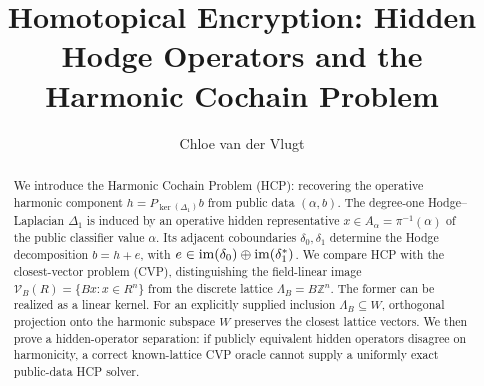 \documentclass[11pt]{article}
\title{Homotopical Encryption: Hidden Hodge Operators and the Harmonic Cochain Problem}
\author{Chloe van der Vlugt}
\date{}
\begin{document}
\maketitle

\begin{abstract}
We introduce the Harmonic Cochain Problem (HCP): recovering the operative
harmonic component \(h=P_{\ker(\Delta_1)}b\) from public data
\((\alpha,b)\). The degree-one Hodge--Laplacian \(\Delta_1\) is induced by
an operative hidden representative \(x\in A_\alpha=\pi^{-1}(\alpha)\) of
the public classifier value \(\alpha\). Its adjacent coboundaries
\(\delta_0,\delta_1\) determine the Hodge decomposition \(b=h+e\), with
\(e\in\operatorname{im}(\delta_0)\oplus\operatorname{im}(\delta_1^\ast)\).
We compare HCP with the closest-vector problem (CVP), distinguishing the
field-linear image \(\mathcal V_B(R)=\{Bx:x\in R^n\}\) from the discrete
lattice \(\Lambda_B=B\mathbb Z^n\). The former can be realized as a linear
kernel. For an explicitly supplied inclusion \(\Lambda_B\subseteq W\),
orthogonal projection onto the harmonic subspace \(W\) preserves the closest
lattice vectors. We then prove a hidden-operator separation: if publicly
equivalent hidden operators disagree on harmonicity, a correct known-lattice
CVP oracle cannot supply a uniformly exact public-data HCP solver.
\end{abstract}

\setcounter{tocdepth}{1}
\tableofcontents
\clearpage








\clearpage


\end{document}
